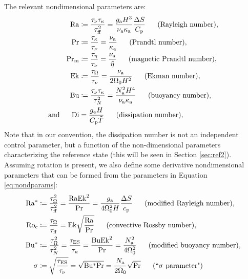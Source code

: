 \documentclass[12pt]{article}
\numberwithin{equation}{section}
\newcommand{\ga}{g_{\rm a}}
\newcommand{\nsqa}{N^2_{\rm a}}
\newcommand{\nua}{\nu_{\rm a}}
\newcommand{\kappaa}{\kappa_{\rm a}}
\begin{document}
	The relevant nondimensional parameters are:
	\begin{subequations}\label{eq:nondparams}
		\begin{align}
			\ra &\define \frac{\taunu\taukappa}{\tauff^2}=\frac{\ga H^3}{\nua \kappaa} \frac{\Delta S}{\cpcap}\five\text{(Rayleigh number)},\\ 
			\pr &\define \frac{\taukappa}{\taunu}=\frac{\nua}{\kappaa}\five\text{(Prandtl number)},\\
			\prm &\define \frac{\taueta}{\taunu}=\frac{\nua}{\tilde{\eta}}\five\text{(magnetic Prandtl number)},\\
			\ek &\define \frac{\tauomega}{\taunu}=\frac{\nua}{2\Omega_0H^2}\five\text{(Ekman number)},\\	
			\bu &\define \frac{\taunu\taukappa}{\taun^2}=\frac{\nsqa H^4}{\nua\kappaa}\five\text{(buoyancy number)},\\
			\andd \di &= \frac{\ga H}{\cpcap\tilde{T}}\five\text{(dissipation number)},
		\end{align}
	\end{subequations}
	Note that in our convention, the dissipation number is not an independent control parameter, but a function of the non-dimensional parameters characterizing the reference state (this will be seen in Section \ref{sec:ref2}). 
	Assuming rotation is present, we also define some derivative nondimensional parameters that can be formed from the parameters in Equation \eqref{eq:nondparams}: 
	\begin{subequations}\label{eq:nondparams2}
	\begin{align}
		\ramod &\define \frac{\tauomega^2}{\tauff^2}=\frac{\ra\ek^2}{\pr}=\frac{\ga}{4\omnought^2H} \frac{\Delta S}{\cp}\five\text{(modified Rayleigh number)},\\ 
		\roc&\define \frac{\tauomega}{\tauff}=\ek\sqrt{\frac{\ra}{\pr}}\five\text{(convective Rossby number)},\\
		\bumod &\define \frac{\tauomega^2}{\taun^2}=\frac{\taues}{\taukappa}=\frac{\bu\ek^2}{\pr}=\frac{\nsqa}{4\omnought^2} \five\text{(modified buoyancy number)},\\ 
		\sigma &\define \sqrt{\frac{\taues}{\taunu}}=\sqrt{\bumod\pr} =\frac{N_{\rm a}}{2\omnought}\sqrt{\pr}\five\text{(``$\sigma$ parameter")}
		\end{align}
	\end{subequations}
\end{document}
